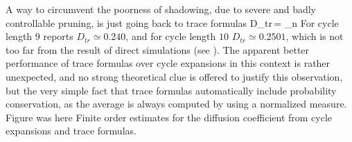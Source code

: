 {%
%
%
%
A way to circumvent the poorness of shadowing, due to severe and badly
controllable pruning, is just going back to trace formulas
 \beq D_{tr}\,= \lim_{n \to
  \infty}
\label{DL-trace}
\eeq
For cycle length $9$  reports $D_{tr}\simeq 0.240$, and
for cycle length $10$ $D_{tr}\simeq 0.2501$, which is not too far from
the result of direct simulations (see ).  The
apparent better performance of trace formulas over cycle expansions in
this context is rather unexpected, and no strong theoretical clue is
offered to justify this observation, but the very simple fact that
trace formulas automatically include probability conservation, as the
average is always computed by using a normalized measure.
%
{}{ Figure was here Finite order estimates for the diffusion
  coefficient from cycle expansions and trace formulas.  }
%
}
